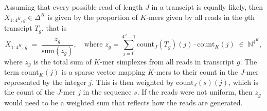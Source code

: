 \documentclass[11pt]{article}
\newcommand{\rob}[1]{\todo[inline]{\textbf{Robert: }#1}}
\begin{document}
Assuming that every possible read  of length $J$ in a transcipt is equally likely, 
 then $X_{1:4^K, g} \in \Delta^K$ is given by the proportion of $K$-mers given by all reads in the $g$th transcipt $T_g$, that is
% 
\begin{equation}
  X_{1:4^K, \, g} \; =\; \frac{z_g}{\textrm{sum}(z_g)}, \quad \mbox{where } z_g =  \sum_{j = 0}^{4^J - 1} \textrm{count}_J(T_g)(j) \cdot \textrm{count}_K(j)\; \in\; \mathbb{N}^{4^K},
\end{equation}
where $z_g$ is the total sum of $K$-mer simplexes from all reads in transcript $g$. The term
$\textrm{count}_K(j)$ is a sparse vector mapping $K$-mers to their
count in the $J$-mer represented by the integer $j$.  
This is then
weighted by $\textrm{count}_J(s)(j)$, which is the count of the $J$-mer $j$ in
the sequence $s$. If the reads were not uniform, then $z_g$ would need to be a  weighted sum that reflects how the reads are generated.
 
\end{document}
